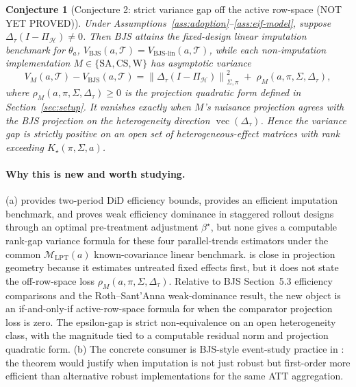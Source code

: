 \documentclass[11pt]{article}
\newcommand{\calH}{\mathcal{H}}
\theoremstyle{definition}
\theoremstyle{plain}
\newtheorem{conjecture}{Conjecture}
\theoremstyle{remark}
\begin{document}
\begin{conjecture}[Conjecture 2: strict variance gap off the active row-space (NOT YET PROVED)]\label{conj:variance-gap}
Under Assumptions~\ref{ass:adoption}--\ref{ass:eif-model}, suppose
\(\Delta_\tau(I-\Pi_{\calH})\ne 0\).  Then BJS attains the fixed-design
linear imputation benchmark for \(\theta_a\),
\(V_{\mathrm{BJS}}(a,\mathcal T)
=V_{\mathrm{BJS}\text{-}\mathrm{lin}}(a,\mathcal T)\), while each
non-imputation implementation
\(M\in\{\mathrm{SA},\mathrm{CS},\mathrm{W}\}\) has asymptotic variance
\[
V_M(a,\mathcal T)-V_{\mathrm{BJS}}(a,\mathcal T)
=
\left\|\Delta_\tau(I-\Pi_{\calH})\right\|_{\Sigma,\pi}^2
\;+\;
\rho_M(a,\pi,\Sigma,\Delta_\tau),
\]
where \(\rho_M(a,\pi,\Sigma,\Delta_\tau)\ge 0\) is the projection quadratic form
defined in Section~\ref{sec:setup}.  It vanishes exactly when \(M\)'s nuisance
projection agrees with the BJS projection on the heterogeneity direction
\(\operatorname{vec}(\Delta_\tau)\).  Hence the variance gap is strictly
positive on an open set of heterogeneous-effect matrices with rank exceeding
\(K_\star(\pi,\Sigma,a)\).
\end{conjecture}

\paragraph{Why this is new and worth studying.}
(a) \citet{SantAnnaZhao2020} provides two-period DiD efficiency bounds,
\citet{BorusyakJaravelSpiess2024} provides an efficient imputation benchmark,
and \citet{RothSantAnna2023Efficient} proves weak efficiency dominance in
staggered rollout designs through an optimal pre-treatment adjustment
\(\beta^\star\), but none gives a computable rank-gap variance formula for
these four parallel-trends estimators under the common
\(\mathcal M_{\mathrm{LPT}}(a)\) known-covariance linear benchmark.
\citet{Gardner2022} is close in projection geometry because it estimates
untreated fixed effects first, but it does not state the off-row-space loss
\(\rho_M(a,\pi,\Sigma,\Delta_\tau)\).  Relative to BJS Section~5.3 efficiency
comparisons and the Roth--Sant'Anna weak-dominance result, the new object is an
if-and-only-if active-row-space formula for when the comparator projection loss
is zero.  The epsilon-gap is strict non-equivalence on an open heterogeneity
class, with the magnitude tied to a computable residual norm and projection
quadratic form.  (b) The concrete consumer is BJS-style event-study practice in
\citet{BorusyakJaravelSpiess2024}: the theorem would justify when imputation is
not just robust but first-order more efficient than alternative robust
implementations for the same ATT aggregation.
\end{document}
